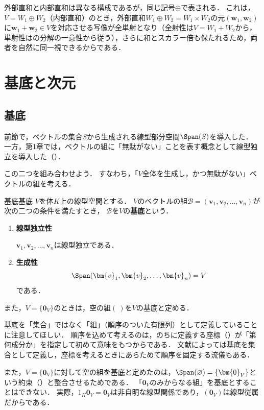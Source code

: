 \begin{remark}[内部直和と外部直和の同一視]
  外部直和と内部直和は異なる構成であるが，同じ記号$\oplus$で表される．
  これは，$V = W_1 \oplus W_2$（内部直和）のとき，外部直和$W_1 \oplus W_2 = W_1 \times W_2$の元$(\bm{w}_1, \bm{w}_2)$に$\bm{w}_1 + \bm{w}_2 \in V$を対応させる写像が全単射となり（全射性は$V = W_1 + W_2$から，単射性はの分解の一意性から従う），さらに和とスカラー倍も保たれるため，両者を自然に同一視できるからである．
\end{remark}

\section{基底と次元}

\subsection{基底}

前節で，ベクトルの集合$S$から生成される線型部分空間$\Span(S)$を導入した．
一方，第1章では，ベクトルの組に「無駄がない」ことを表す概念として線型独立を導入した（）．

この二つを組み合わせよう．
すなわち，「$V$全体を生成し，かつ無駄がない」ベクトルの組を考える．

\begin{definition}{基底}{基底}
  $V$を体$K$上の線型空間とする．
  $V$のベクトルの組$\mathcal{B} = (\bm{v}_1, \bm{v}_2, \dots, \bm{v}_n)$が次の二つの条件を満たすとき，
  $\mathcal{B}$を$V$の\textbf{基底}という．
  \begin{enumerate}[label=(\roman*),leftmargin=3.2em]
    \item \textbf{線型独立性}

    $\bm{v}_1, \bm{v}_2, \dots, \bm{v}_n$は線型独立である．

    \item \textbf{生成性}
    \[
      \Span(\bm{v}_1, \bm{v}_2, \dots, \bm{v}_n) = V
    \]
    である．
  \end{enumerate}

  また，$V = \{\bm{0}_V\}$のときは，空の組$(\ )$を$V$の基底と定める．
\end{definition}

\begin{remark}
  基底を「集合」ではなく「組」（順序のついた有限列）として定義していることに注意してほしい．
  順序を込めて考えるのは，のちに定義する座標（）が「第何成分か」を指定して初めて意味をもつからである．
  文献によっては基底を集合として定義し，座標を考えるときにあらためて順序を固定する流儀もある．

  また，$V = \{\bm{0}_V\}$に対して空の組を基底と定めたのは，$\Span(\varnothing) = \{\bm{0}_V\}$という約束（）と整合させるためである．
  「$\bm{0}_V$のみからなる組」を基底とすることはできない．
  実際，$1_K \bm{0}_V = \bm{0}_V$は非自明な線型関係であり，$(\bm{0}_V)$は線型従属だからである．
\end{remark}

